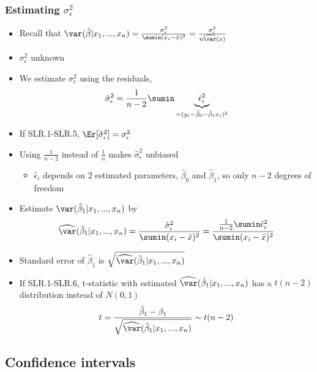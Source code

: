 \begin{frame}[allowframebreaks] 
  \frametitle{Estimating $\sigma_\epsilon^2$}
  \begin{itemize}
  \item Recall that $\var(\hat{\beta}|x_1,...,x_n) =
    \frac{\sigma^2_\epsilon}{\sumin (x_i - \bar{x})^2} =
    \frac{\sigma_\epsilon^2}{n \widehat{\var}(x)}$
  \item $\sigma_\epsilon^2$ unknown
  \item We estimate $\sigma_\epsilon^2$ using the residuals,
    \[ \hat{\sigma}_\epsilon^2 = \frac{1}{n-2} \sumin
    \underbrace{\hat{\epsilon}_i^2}_{=(y_i - \hat{\beta}_0 -
      \hat{\beta}_1 x_i)^2} \]
  \item If SLR.1-SLR.5, $\Er[\hat{\sigma}_\epsilon^2 ] = \sigma_\epsilon^2$ 
  \item Using $\frac{1}{n-2}$ instead of $\frac{1}{n}$ makes
    $\hat{\sigma}_\epsilon^2$ unbiased
    \begin{itemize}
    \item $\hat{\epsilon}_i$ depends on 2 estimated parameters,
      $\hat{\beta}_0$ and $\hat{\beta}_1$, so only $n-2$ degrees of
      freedom 
    \end{itemize}    
  \item Estimate $\var(\hat{\beta}_1|x_1,...,x_n)$ by 
    \[ \widehat{\var}(\hat{\beta}_1|x_1,...,x_n) =
    \frac{\hat{\sigma}^2_\epsilon}{\sumin (x_i - \bar{x})^2} =
    \frac{\frac{1}{n-2} \sumin \hat{\epsilon}_i^2}{\sumin (x_i -
      \bar{x})^2} \]
  \item Standard error of $\hat{\beta}_1$ is
    $\sqrt{\widehat{\var}(\hat{\beta}_1|x_1,...,x_n)}$ 
  \item If SLR.1-SLR.6, t-statistic with estimated
    $\widehat{\var}(\hat{\beta}_1|x_1,...,x_n)$ has a $t(n-2)$
    distribution instead of $N(0,1)$
    \[ t = \frac{\hat{\beta}_1 -
      \beta_1}{\sqrt{\widehat{\var}(\hat{\beta}_1|x_1, ..., x_n)}} \sim
    t(n-2) \]    
  \end{itemize}
\end{frame}
\subsection{Confidence intervals}

